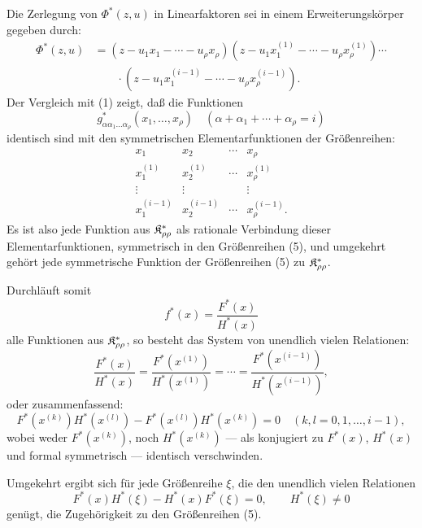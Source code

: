 Die Zerlegung von $\Phi^*(z,u)$ in Linearfaktoren sei in einem Erweiterungskörper gegeben durch:
\begin{equation}
\begin{aligned}
 \Phi^*(z,u)&=(z-u_1x_1-\cdots-u_\rho x_\rho)
 (z-u_1x_1^{(1)}-\cdots-u_\rho x_\rho^{(1)})\cdots\\
 &\qquad\cdot
 (z-u_1x_1^{(i-1)}-\cdots-u_\rho x_\rho^{(i-1)}).
\end{aligned}
\tag{4}
\end{equation}
Der Vergleich mit (1) zeigt, daß die Funktionen
\[
  g^*_{\alpha\alpha_1\ldots\alpha_\rho}(x_1,
  \ldots,x_\rho)\quad(\alpha+\alpha_1+\cdots+\alpha_\rho=i)
\]
identisch sind mit den symmetrischen Elementarfunktionen der Größenreihen:
\begin{equation}
\begin{array}{cccc}
  x_1 & x_2 & \cdots & x_\rho\\
  x_1^{(1)} & x_2^{(1)} & \cdots & x_\rho^{(1)}\\
  \vdots & \vdots & & \vdots\\
  x_1^{(i-1)} & x_2^{(i-1)} & \cdots & x_\rho^{(i-1)}.
\end{array}
\tag{5}
\end{equation}
Es ist also jede Funktion aus $\mathfrak{K}^*_{\rho\rho}$ als rationale Verbindung dieser Elementarfunktionen, symmetrisch in den Größenreihen (5), und umgekehrt gehört jede symmetrische Funktion der Größenreihen (5) zu $\mathfrak{K}^*_{\rho\rho}$.

Durchläuft somit
\[
  f^*(x)=\frac{F^*(x)}{H^*(x)}
\]
alle Funktionen aus $\mathfrak{K}^*_{\rho\rho}$, so besteht das System von unendlich vielen Relationen:
\begin{equation}
  \frac{F^*(x)}{H^*(x)}=
  \frac{F^*(x^{(1)})}{H^*(x^{(1)})}=\cdots=
  \frac{F^*(x^{(i-1)})}{H^*(x^{(i-1)})},
\tag{6}
\end{equation}
oder zusammenfassend:
\[
  F^*(x^{(k)})H^*(x^{(l)})-
  F^*(x^{(l)})H^*(x^{(k)})=0
  \quad(k,l=0,1,\ldots,i-1),
\]
wobei weder $F^*(x^{(k)})$, noch $H^*(x^{(k)})$ --- als konjugiert zu $F^*(x)$, $H^*(x)$ und formal symmetrisch --- identisch verschwinden.

Umgekehrt ergibt sich für jede Größenreihe $\xi$, die den unendlich vielen Relationen
\begin{equation}
  F^*(x)H^*(\xi)-H^*(x)F^*(\xi)=0,
  \qquad H^*(\xi)\ne0
\tag{7}
\end{equation}
genügt, die Zugehörigkeit zu den Größenreihen (5).

